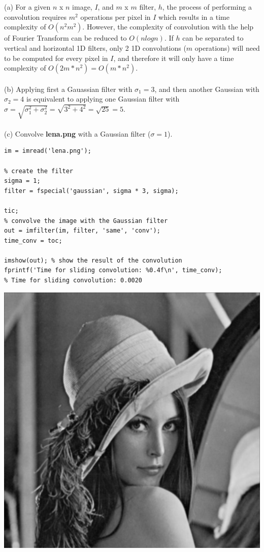 \documentclass[11pt]{article}
\begin{document}
\section{}
(a) For a given $n$ x $n$ image, $I$, and $m$ x $m$ filter, $h$, the process of performing a convolution requires $m^2$ operations per pixel in $I$ which results in a time complexity of $O(n^2m^2)$. However, the complexity of convolution with the help of Fourier Transform can be reduced to $O(nlogn)$. If $h$ can be separated to vertical and horizontal 1D filters, only 2 1D convolutions ($m$ operations) will need to be computed for every pixel in $I$, and therefore it will only have a time complexity of  $O(2m*n^2) = O(m*n^2)$. 
\\\\
(b) Applying first a Gauassian filter with $\sigma_1=3$, and then another Gaussian with $\sigma_2=4$ is equivalent to applying one Gaussian filter with $\sigma=\sqrt{\sigma_1^2+\sigma_2^2}=\sqrt{3^2+4^2}=\sqrt{25}=5$.
\\\\
(c) Convolve \textbf{lena.png} with a Gaussian filter ($\sigma=1$).
\begin{lstlisting}
im = imread('lena.png');

% create the filter
sigma = 1;
filter = fspecial('gaussian', sigma * 3, sigma); 

tic;
% convolve the image with the Gaussian filter
out = imfilter(im, filter, 'same', 'conv');
time_conv = toc;

imshow(out); % show the result of the convolution
fprintf('Time for sliding convolution: %0.4f\n', time_conv);
% Time for sliding convolution: 0.0020
\end{lstlisting}
\includegraphics[scale=0.5]{lena_conv}
\end{document}
